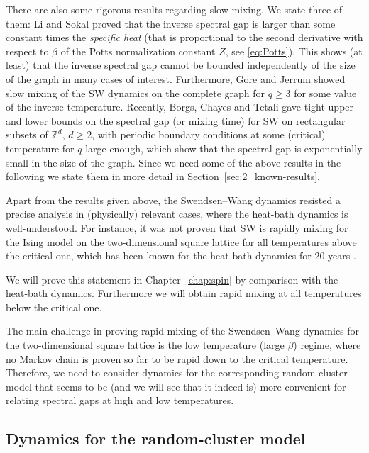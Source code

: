 \documentclass{dis}
\theoremstyle{citing}
\begin{document}
There are also some rigorous results regarding slow mixing. 
We state three of them: Li and Sokal 
\cite{LiS} proved that the inverse spectral gap is larger 
than some constant times the \emph{specific heat} 
(that is proportional to the second derivative with respect to 
$\beta$ of the Potts normalization constant $Z$, 
see \eqref{eq:Potts}). 
This shows (at least) that the inverse spectral gap 
cannot be bounded independently of the size of the 
graph in many cases of interest. 
Furthermore, Gore and Jerrum \cite{GJ} showed slow mixing of the 
SW dynamics on the complete graph for $q\ge3$ for some value of 
the inverse temperature. 
Recently, Borgs, Chayes and Tetali \cite{BCT} 
gave tight upper and lower bounds on the spectral gap 
(or mixing time) for SW on rectangular subsets 
of ${\ensuremath{\mathbb{Z}}}^d$, $d\ge2$, with periodic boundary conditions 
at some (critical) temperature for $q$ large enough, 
which show that the spectral gap is exponentially small in 
the size of the graph.
Since we need some of the above results in the following 
we state them in more detail in 
Section~\ref{sec:2_known-results}.

Apart from the results given above, the Swendsen--Wang dynamics 
resisted a precise analysis in (physically) relevant cases, 
where the heat-bath dynamics is well-understood.
For instance, it was 
not proven that SW is rapidly mixing for the Ising model on the 
two-dimensional square lattice for all temperatures above 
the critical one, which has been known for the heat-bath dynamics 
for 20 years \cite{MO1,MO2}.

We will prove this statement in Chapter~\ref{chap:spin} by 
comparison with the heat-bath dynamics.
Furthermore we will obtain rapid mixing at all temperatures below 
the critical one.
 
The main challenge in proving rapid mixing of the Swendsen--Wang 
dynamics for the two-dimensional square lattice is the low 
temperature (large $\beta$) regime, where no Markov chain 
is proven so far to be rapid down to the critical temperature. 
Therefore, we need to consider dynamics for the corresponding 
random-cluster model that seems to be 
(and we will see that it indeed is) 
more convenient for relating spectral gaps at high and low 
temperatures.

\subsection
	{Dynamics for the random-cluster model}
\end{document}
